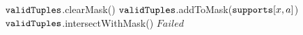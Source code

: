     \label{line:updateTable:1} 
        \STATE $\texttt{validTuples}$.clearMask() \label{line:updateTable:4} 
         \label{line:updateTable:5} 
          \STATE $\texttt{validTuples}$.addToMask($\texttt{supports}[x,a]$) \label{line:updateTable:6} 
        \ENDFOREACH      
        \STATE $\texttt{validTuples}$.intersectWithMask() \label{line:updateTable:7} 
         \label{line:updateTable:8} 
          \RETURN $Failed$  \label{line:updateTable:9} 
        \ENDIF
      \Endfunc


